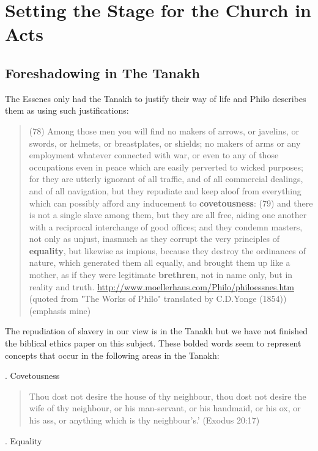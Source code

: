 \documentclass[11pt]{article}
\begin{document}
\section{Setting the Stage for the Church in Acts}

\subsection{Foreshadowing in The Tanakh} \label{foreshadowing in the tanakh}
The Essenes only had the Tanakh to justify their way of life and Philo describes them as using such justifications:
\begin{quote}
(78) Among those men you will find no makers of arrows, or javelins, or swords, or helmets, or breastplates, or shields; no makers of arms or any employment whatever connected with war, or even to any of those occupations even in peace which are easily perverted to wicked purposes; for they are utterly ignorant of all traffic, and of all commercial dealings, and of all navigation, but they repudiate and keep aloof from everything which can possibly afford any inducement to \textbf{covetousness}: (79) and there is not a single slave among them, but they are all free, aiding one another with a reciprocal interchange of good offices; and they condemn masters, not only as unjust, inasmuch as they corrupt the very principles of \textbf{equality}, but likewise as impious, because they destroy the ordinances of nature, which generated them all equally, and brought them up like a mother, as if they were legitimate \textbf{brethren}, not in name only, but in reality and truth.  \url{http://www.moellerhaus.com/Philo/philoessnes.htm} (quoted from "The Works of Philo" translated by C.D.Yonge (1854)) (emphasis mine)
\end{quote}
The repudiation of slavery in our view is in the Tanakh but we have not finished the biblical ethics paper on this subject. These bolded words seem to represent concepts that occur in the following areas in the Tanakh: \newline

. Covetousness
\begin{quote}
Thou dost not desire the house of thy neighbour, thou dost not desire the wife of thy neighbour, or his man-servant, or his handmaid, or his ox, or his ass, or anything which is thy neighbour's.' (Exodus 20:17)
\end{quote}

. Equality \newline
\end{document}

